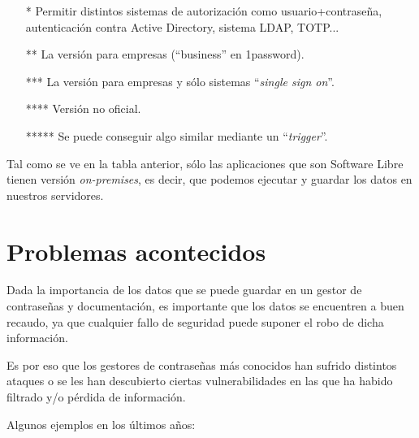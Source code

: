 \documentclass{\ClassPath/viu-tfm-template}
\begin{document}
\begin{itemize}
    \item[*] Permitir distintos sistemas de autorización como usuario+contraseña, autenticación contra Active Directory, sistema LDAP, TOTP...
    \item[**] La versión para empresas (“business” en 1password).
    \item[***] La versión para empresas y sólo sistemas “\textit{single sign on}”.
    \item[****] Versión no oficial.
    \item[*****] Se puede conseguir algo similar mediante un “\textit{trigger}”.
\end{itemize}

Tal como se ve en la tabla anterior, sólo las aplicaciones que son Software Libre tienen versión \textit{on-premises}, es decir, que podemos ejecutar y guardar los datos en nuestros servidores.


\section{Problemas acontecidos}

Dada la importancia de los datos que se puede guardar en un gestor de contraseñas y documentación, es importante que los datos se encuentren a buen recaudo, ya que cualquier fallo de seguridad puede suponer el robo de dicha información.

Es por eso que los gestores de contraseñas más conocidos han sufrido distintos ataques o se les han descubierto ciertas vulnerabilidades en las que ha habido filtrado y/o pérdida de información.

Algunos ejemplos en los últimos años:
\end{document}
